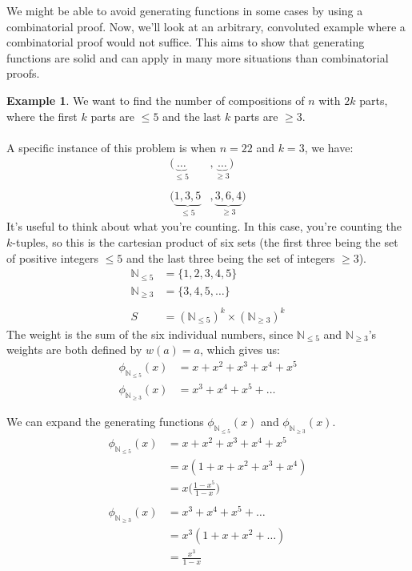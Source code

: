 \documentclass[]{article}
\theoremstyle{definition}
\newtheorem{ex}{Example}[section]
\newcommand{\lecture}[1]{\marginpar{{\footnotesize $\leftarrow$ \underline{#1}}}}
\begin{document}
				We might be able to avoid generating functions in some cases by using a combinatorial proof. Now, we'll look at an arbitrary, convoluted example where a combinatorial proof would not suffice. This aims to show that generating functions are solid and can apply in many more situations than combinatorial proofs.
				
				\begin{ex}
					We want to find the number of compositions of $n$ with $2k$ parts, where the first $k$ parts are $\le 5$ and the last $k$ parts are $\ge 3$. 
					\\ \\
					A specific instance of this problem is when $n = 22$ and $k = 3$, we have:
					\begin{align*}
						(\underbrace{\dots}_{\le 5}&, \underbrace{\dots}_{\ge 3}) \\ \\
						(\underbrace{1, 3, 5}_{\le 5}&, \underbrace{3, 6, 4}_{\ge 3})
					\end{align*}
					It's useful to think about what you're counting. In this case, you're counting the $k$-tuples, so this is the cartesian product of six sets (the first three being the set of positive integers $\le 5$ and the last three being the set of integers $\ge 3$).
					\begin{align*}
						\mathbb{N}_{\le 5} &= \{1, 2, 3, 4, 5\} \\
						\mathbb{N}_{\ge 3} &= \{3, 4, 5, \ldots\}
						\\ \\
						S &= (\mathbb{N}_{\le 5})^k \times (\mathbb{N}_{\ge 3})^k
					\end{align*}
					The weight is the sum of the six individual numbers, since $\mathbb{N}_{\le 5}$ and $\mathbb{N}_{\ge 3}$'s weights are both defined by $w(a) = a$, which gives us:
					\begin{align*}
						\phi_{\mathbb{N}_{\le 5}}(x) &= x + x^2 + x^3 + x^4 + x^5 \\
						\phi_{\mathbb{N}_{\ge 3}}(x) &= x^3 + x^4 + x^5 + \ldots
					\end{align*}

					\lecture{January 23, 2013}
					We can expand the generating functions $\phi_{\mathbb{N}_{\le 5}}(x)$ and $\phi_{\mathbb{N}_{\ge 3}}(x)$.
					\begin{align*}
						\phi_{\mathbb{N}_{\le 5}}(x) &= x + x^2 + x^3 + x^4 + x^5 \\
						&= x(1 + x + x^2 + x^3 + x^4) \\
						&= x \bigg( \frac{1 - x^5}{1 - x} \bigg)
						\\ \\
						\phi_{\mathbb{N}_{\ge 3}}(x) &= x^3 + x^4 + x^5 + \ldots \\
						&= x^3(1 + x + x^2 + \ldots) \\
						&= \frac{x^3}{1 - x}
					\end{align*}


\end{ex}
\end{document}
